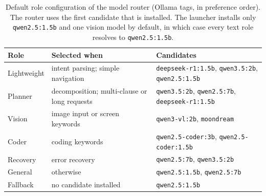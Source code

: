\begin{table}[t]
\centering
\caption{Default role configuration of the model router (Ollama tags, in preference order). The router uses the first candidate that is installed. The launcher installs only \texttt{qwen2.5:1.5b} and one vision model by default, in which case every text role resolves to \texttt{qwen2.5:1.5b}.}
\label{tab:routing}
\footnotesize
\setlength{\tabcolsep}{3pt}
\begin{tabular}{@{}lp{3.05cm}p{2.85cm}@{}}
\toprule
Role & Selected when & Candidates \\
\midrule
Lightweight & intent parsing; simple navigation & \texttt{deepseek-r1:1.5b}, \texttt{qwen3.5:2b}, \texttt{qwen2.5:1.5b} \\
Planner & decomposition; multi-clause or long requests & \texttt{qwen3.5:2b}, \texttt{qwen2.5:7b}, \texttt{deepseek-r1:1.5b} \\
Vision & image input or screen keywords & \texttt{qwen3-vl:2b}, \texttt{moondream} \\
Coder & coding keywords & \texttt{qwen2.5-coder:3b}, \texttt{qwen2.5-coder:1.5b} \\
Recovery & error recovery & \texttt{qwen2.5:7b}, \texttt{qwen3.5:2b} \\
General & otherwise & \texttt{qwen2.5:1.5b}, \texttt{qwen2.5:7b} \\
Fallback & no candidate installed & \texttt{qwen2.5:1.5b} \\
\bottomrule
\end{tabular}
\end{table}
